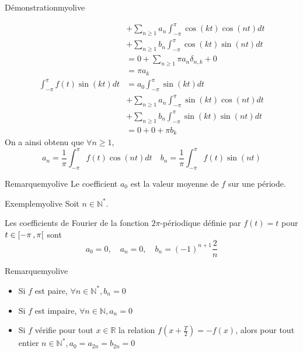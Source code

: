 \begin{omed}{Démonstration}{myolive}
\begin{enumerate}
\begin{align*}
                    &+ \sum\limits_{n \geq 1} a_n \int_{-\pi}^{\pi} \cos(kt) \cos(nt)dt \\
                    & + \sum\limits_{n \geq 1} b_n \int_{-\pi}^{\pi} \cos(kt) \sin(nt) dt \\
                    &= 0 + \sum\limits_{n \geq 1} \pi a_n \delta_{n,k} + 0 \\
                    &= \pi a_k \\
                    \int_{-\pi}^{\pi} f(t) \sin(kt)dt &= a_0 \int_{-\pi}^{\pi} \sin(kt)dt \\
                    &+ \sum\limits_{n \geq 1} a_n \int_{-\pi}^{\pi} \sin(kt) \cos(nt)dt \\
                    &+ \sum\limits_{n \geq 1} b_n \int_{-\pi}^{\pi} \sin(kt) \sin(nt) dt \\
                    & = 0 + 0 + \pi b_k 
                \end{align*}
                On a ainsi obtenu que $\forall n \geq 1$,
                \[ a_n = \frac{1}{\pi} \int_{-\pi}^{\pi} f(t) \cos(nt)dt \quad b_n = \frac{1}{\pi} \int_{-\pi}^{\pi} f(t) \sin(nt) \]
        \end{enumerate}
        \null\hfill{\textcolor{myolive}{}}
    \end{omed}

    \begin{omed}{Remarque}{myolive}
        Le coefficient $a_0$ est la valeur moyenne de $f$ sur une période.
    \end{omed}
    
    \begin{omed}{Exemple}{myolive}
        Soit $n \in \mathbb{N}^*$.
        
        Les coefficients de Fourier de la fonction $2\pi$-périodique définie par $f(t) = t$ pour $t \in \left[ -\pi \, , \pi \right[$ sont 
        \[ a_0 = 0, \quad a_n = 0, \quad b_n = (-1)^{n+1}\frac{2}{n} \]
    \end{omed}

    \begin{omed}{Remarque}{myolive}
        \begin{itemize}
            \item Si $f$ est paire, $\forall n \in \mathbb{N}^*, b_n = 0$
            \item Si $f$ est impaire, $\forall n \in \mathbb{N}, a_n = 0$
            \item Si $f$ vérifie pour tout $x \in \mathbb{R}$ la relation $f\left(x + \frac{T}{2}\right) = -f(x)$, alors pour tout entier $n \in \mathbb{N}^*, a_0 = a_{2n} = b_{2n} = 0$
        \end{itemize}
    \end{omed}

